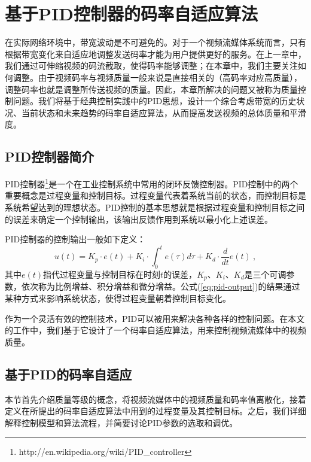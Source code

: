 \chapter{基于PID控制器的码率自适应算法}

在实际网络环境中，带宽波动是不可避免的。对于一个视频流媒体系统而言，只有根据带宽变化来自适应地调整发送码率才能为用户提供更好的服务。在上一章中，我们通过可伸缩视频的码流截取，使得码率能够调整；在本章中，我们主要关注如何调整。由于视频码率与视频质量一般来说是直接相关的（高码率对应高质量），调整码率也就是调整所传送视频的质量。因此，本章所解决的问题又被称为质量控制问题。我们将基于经典控制实践中的PID思想，设计一个综合考虑带宽的历史状况、当前状态和未来趋势的码率自适应算法，从而提高发送视频的总体质量和平滑度。

\section{PID控制器简介}

PID控制器\footnote{http://en.wikipedia.org/wiki/PID\_controller}是一个在工业控制系统中常用的闭环反馈控制器。PID控制中的两个重要概念是过程变量和控制目标。过程变量代表着系统当前的状态，而控制目标是系统希望达到的理想状态。PID控制的基本思想就是根据过程变量和控制目标之间的误差来确定一个控制输出，该输出反馈作用到系统以最小化上述误差。

PID控制器的控制输出一般如下定义：
\begin{equation}
\label{eq:pid-output}
u(t) = {K_p} \cdot e(t) + {K_i} \cdot \int_0^t {e(\tau )d\tau }  + {K_d} \cdot \frac{d}{{dt}}e(t) \: ,
\end{equation}
其中$e(t)$指代过程变量与控制目标在时刻$t$的误差，$K_p$、$K_i$、$K_d$是三个可调参数，依次称为比例增益、积分增益和微分增益。公式(\ref{eq:pid-output})的结果通过某种方式来影响系统状态，使得过程变量朝着控制目标变化。

作为一个灵活有效的控制技术，PID可以被用来解决各种各样的控制问题\supercite{Wong2004}\supercite{Li1999}。在本文的工作中，我们基于它设计了一个码率自适应算法，用来控制视频流媒体中的视频质量。

\section{基于PID的码率自适应}

本节首先介绍质量等级的概念，将视频流媒体中的视频质量和码率值离散化，接着定义在所提出的码率自适应算法中用到的过程变量及其控制目标。之后，我们详细解释控制模型和算法流程，并简要讨论PID参数的选取和调优。


